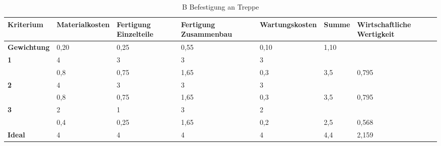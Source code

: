 \documentclass[10pt,a4paper]{article}
\begin{document}
\begin{table}[h!]
    \centering
    \hspace*{0in} %
    \begin{tabular}{>{\bfseries}p{2cm} p{2.2cm} p{2cm} p{2cm} p{2.5cm} p{2cm} p{2cm}}
        \toprule
        Kriterium  & Materialkosten & Fertigung Einzelteile & Fertigung Zusammenbau & Wartungskosten & Summe & Wirtschaftliche Wertigkeit \\
        \midrule
        Gewichtung & 0,20           & 0,25                  & 0,55                  & 0,10           & 1,10  &                            \\
        \midrule
        1          & 4              & 3                     & 3                     & 3              &       &                            \\
                   & 0,8            & 0,75                  & 1,65                  & 0,3            & 3,5   & 0,795                      \\
        \midrule
        2          & 4              & 3                     & 3                     & 3              &       &                            \\
                   & 0,8            & 0,75                  & 1,65                  & 0,3            & 3,5   & 0,795                      \\
        \midrule
        3          & 2              & 1                     & 3                     & 2              &       &                            \\
                   & 0,4            & 0,25                  & 1,65                  & 0,2            & 2,5   & 0,568                      \\
        \midrule
        Ideal      & 4              & 4                     & 4                     & 4              & 4,4   & 2,159                      \\
        \bottomrule
    \end{tabular}
    \caption{B Befestigung an Treppe}
\end{table}
\end{document}
